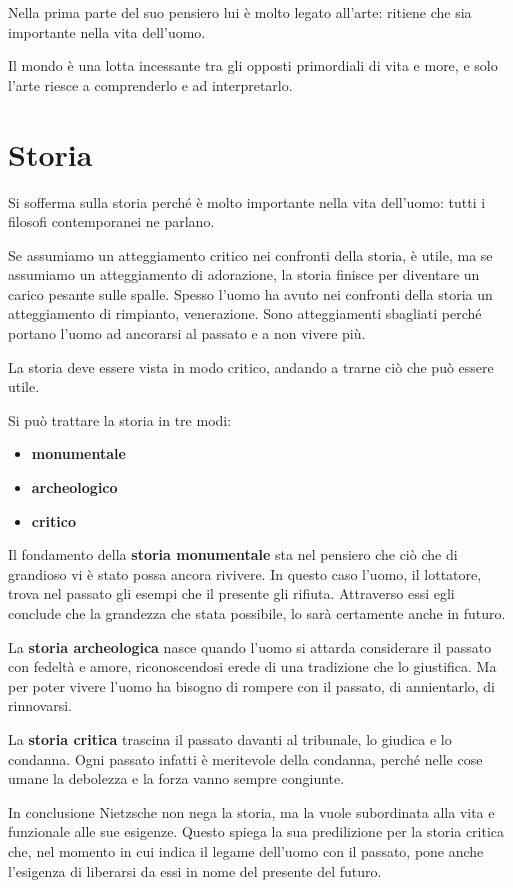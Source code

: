 \documentclass[a4paper, twoside, titlepage]{book}
\begin{document}
Nella prima parte del suo pensiero lui è molto legato all’arte: ritiene che sia importante nella vita dell’uomo.

Il mondo è una lotta incessante tra gli opposti primordiali di vita e more, e solo l’arte riesce a comprenderlo e ad interpretarlo.

\section{Storia}

Si sofferma sulla storia perché è molto importante nella vita dell’uomo: tutti i filosofi contemporanei ne parlano.

Se assumiamo un atteggiamento critico nei confronti della storia, è utile, ma se assumiamo un atteggiamento di adorazione, la storia finisce per diventare un carico pesante sulle spalle.
Spesso l’uomo ha avuto nei confronti della storia un atteggiamento di rimpianto, venerazione. Sono atteggiamenti sbagliati perché portano l’uomo ad ancorarsi al passato e a non vivere più.

La storia deve essere vista in modo critico, andando a trarne ciò che può essere utile.

Si può trattare la storia in tre modi:
\begin{itemize}
\item \textbf{monumentale}
\item \textbf{archeologico}
\item \textbf{critico}
\end{itemize}

Il fondamento della \textbf{storia monumentale} sta nel pensiero che ciò che di grandioso vi è stato possa ancora rivivere. In questo caso l'uomo, il lottatore, trova nel passato gli esempi che il presente gli rifiuta. Attraverso essi egli conclude che la grandezza che stata possibile, lo sarà certamente anche in futuro.

La \textbf{storia archeologica} nasce quando l'uomo si attarda considerare il passato con fedeltà e amore, riconoscendosi erede di una tradizione che lo giustifica. Ma per poter vivere l'uomo ha bisogno di rompere con il passato, di annientarlo, di rinnovarsi.

La \textbf{storia critica} trascina il passato davanti al tribunale, lo giudica e lo condanna. Ogni passato infatti è meritevole della condanna, perché nelle cose umane la debolezza e la forza vanno sempre congiunte.

In conclusione Nietzsche non nega la storia, ma la vuole subordinata alla vita e funzionale alle sue esigenze. Questo spiega la sua predilizione per la storia critica che, nel momento in cui indica il legame dell'uomo con il passato, pone anche l'esigenza di liberarsi da essi in nome del presente del futuro.
\end{document}
